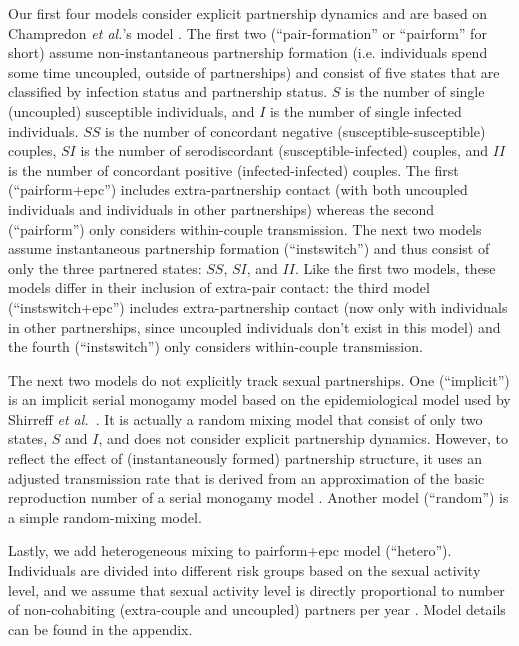 \documentclass[10pt,letterpaper]{article}
\newcommand{\etal}{\textit{et al.}}
\begin{document}
Our first four models consider explicit partnership dynamics and are based on Champredon \etal's model \cite{champredon_hiv_2013}. The first two (``pair-formation'' or ``pairform'' for short) assume non-instantaneous partnership formation (i.e. individuals spend some time uncoupled, outside of partnerships) and consist of five states that are classified by infection status and partnership status. $S$ is the number of single (uncoupled) susceptible individuals, and $I$ is the number of single infected individuals. $SS$ is the number of concordant negative (susceptible-susceptible) couples, $SI$ is the number of serodiscordant (susceptible-infected) couples, and $II$ is the number of concordant positive (infected-infected) couples. The first (``pairform+epc'') includes extra-partnership contact (with both uncoupled individuals and individuals in other partnerships) whereas the second (``pairform'') only considers within-couple transmission. The next two models assume instantaneous partnership formation (``instswitch'') and thus consist of only the three partnered states: $SS$, $SI$, and $II$. Like the first two models, these models differ in their inclusion of extra-pair contact: the third model (``instswitch+epc'') includes extra-partnership contact (now only with individuals in other partnerships, since uncoupled individuals don't exist in this model) and the fourth (``instswitch'') only considers within-couple transmission.

The next two models do not explicitly track sexual partnerships.  One (``implicit'') is an implicit serial monogamy model based on the epidemiological model used by Shirreff \etal\ \cite{shirreff_transmission_2011}. It is actually a random mixing model that consist of only two states, $S$ and $I$, and does not consider explicit partnership dynamics. However, to reflect the effect of (instantaneously formed) partnership structure, it uses an adjusted transmission rate that is derived from an approximation of the basic reproduction number of a serial monogamy model \cite{hollingsworth_hiv1_2008}. Another model (``random'') is a simple random-mixing model.

Lastly, we add heterogeneous mixing to pairform+epc model (``hetero''). Individuals are divided into different risk groups based on the sexual activity level, and we assume that sexual activity level is directly proportional to number of non-cohabiting (extra-couple and uncoupled) partners per year \cite{omori2015dynamics}. Model details can be found in the appendix.
\end{document}
